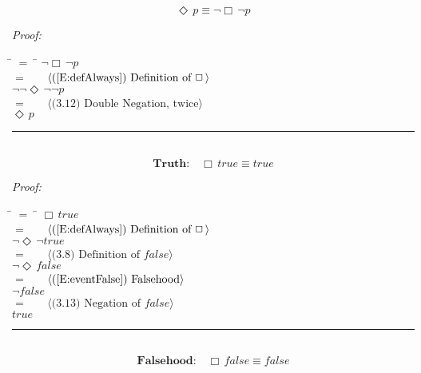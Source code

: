 \documentclass[fleqn, leqno]{article}
\newcommand{\lgap}{2pt} %
\newcommand{\mymathindent}{24pt} %
\newcommand{\Event}{\Diamond\,}
\newcommand{\Always}{\Box\,}
\newcommand{\myqed}{\hfill\rule[-.23ex]{1.2ex}{2.0ex}}
\newcommand{\Gll} {\langle} %
\newcommand{\Ggg} {\rangle} %
\newcommand{\Hint}[1] {\ \ \ $\Gll \mbox{#1} \Ggg$ } %
\begin{document}
\begin{equation}\label{E:eventAsAlways}
\Event p \equiv \lnot\Always\lnot p
\end{equation}

\emph{Proof:}
\begin{tabbing}
\hspace{\mymathindent} \= $= \;$ \= \kill
\> \> $\lnot\Always\lnot p$\\[\lgap]
\> $=$ \> \Hint{(\ref{E:defAlways}) Definition of $\Always$}\\[\lgap]
\> \> $\lnot\lnot\Event\lnot\lnot p$\\[\lgap]
\> $=$ \> \Hint{(3.12) Double Negation, twice}\\[\lgap]
\> \> $\Event p$\\[\lgap]
\end{tabbing}
\myqed\\[\lgap]


\begin{equation}\label{E:alwaysTrue}
\textbf{Truth:}\quad \Always true \equiv true
\end{equation}

\emph{Proof:}
\begin{tabbing}
\hspace{\mymathindent} \= $= \;$ \= \kill
\> \> $\Always true$\\[\lgap]
\> $=$ \> \Hint{(\ref{E:defAlways}) Definition of $\Always$}\\[\lgap]
\> \> $\lnot\Event\lnot true$\\[\lgap]
\> $=$ \> \Hint{(3.8) Definition of $false$}\\[\lgap]
\> \> $\lnot\Event false$\\[\lgap]
\> $=$ \> \Hint{(\ref{E:eventFalse}) Falsehood}\\[\lgap]
\> \> $\lnot false$\\[\lgap]
\> $=$ \> \Hint{(3.13) Negation of $false$}\\[\lgap]
\> \> $true$\\[\lgap]
\end{tabbing}
\myqed\\[\lgap]


\begin{equation}\label{E:alwaysFalse}
\textbf{Falsehood:}\quad \Always false \equiv false
\end{equation}
\end{document}
